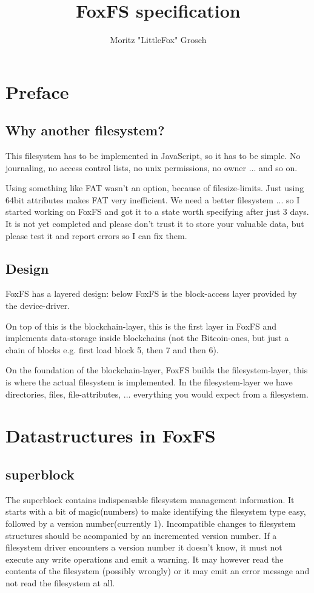 \documentclass[a4paper,12pt]{article}
\author{Moritz "LittleFox" Grosch}
\title{FoxFS specification}
\begin{document}
	\maketitle
	\tableofcontents
	
	\setlength{\parskip}{11pt}

	\section{Preface}	
		\subsection{Why another filesystem?}
			This filesystem has to be implemented in JavaScript, so it has to be simple. No journaling, no access control lists, no unix permissions, no owner ... and so on.
			
			Using something like FAT wasn't an option, because of filesize-limits. Just using 64bit attributes makes FAT very inefficient. We need a better filesystem ... so I started working on FoxFS and got it to a state worth specifying after just 3 days. It is not yet completed and please don't trust it to store your valuable data, but please test it and report errors so I can fix them.
			
		\subsection{Design}
			FoxFS has a layered design: below FoxFS is the block-access layer provided by the device-driver.
			
			On top of this is the blockchain-layer, this is the first layer in FoxFS and implements data-storage inside blockchains (not the Bitcoin-ones, but just a chain of blocks e.g. first load block 5, then 7 and then 6).
			
			On the foundation of the blockchain-layer, FoxFS builds the filesystem-layer, this is where the actual filesystem is implemented. In the filesystem-layer we have directories, files, file-attributes, ... everything you would expect from a filesystem.
	
	\section{Datastructures in FoxFS}
		\subsection{superblock}
			The superblock contains indispensable filesystem management information. It starts with a bit of magic(numbers) to make identifying the filesystem type easy, followed by a version number(currently 1). Incompatible changes to filesystem structures should be acompanied by an incremented version number. If a filesystem driver encounters a version number it doesn't know, it must not execute any write operations and emit a warning. It may however read the contents of the filesystem (possibly wrongly) or it may emit an error message and not read the filesystem at all.
\end{document}
